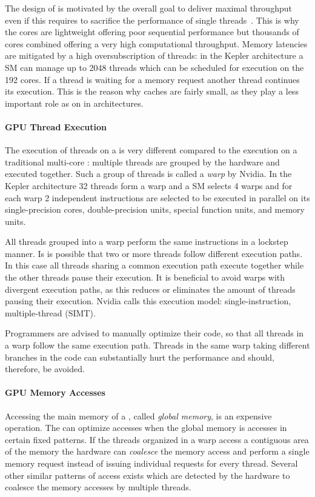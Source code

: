 The design of \GPUs is motivated by the overall goal to deliver maximal throughput even if this requires to sacrifice the performance of single threads~\cite{GarlandK10}.
This is why the \GPU cores are lightweight offering poor sequential performance but thousands of cores combined offering a very high computational throughput.
Memory latencies are mitigated by a high oversubscription of threads:
in the Kepler architecture a SM can manage up to 2048 threads which can be scheduled for execution on the 192 cores.
If a thread is waiting for a memory request another thread continues its execution.
This is the reason why caches are fairly small, as they play a less important role as on in \CPU architectures.

\paragraph{GPU Thread Execution}
The execution of threads on a \GPU is very different compared to the execution on a traditional multi-core \CPU:
multiple threads are grouped by the hardware and executed together.
Such a group of threads is called a \emph{warp} by Nvidia.
In the Kepler architecture 32 threads form a warp and a SM selects 4 warps and for each warp 2 independent instructions are selected to be executed in parallel on its single-precision cores, double-precision units, special function units, and memory units.

All threads grouped into a warp perform the same instructions in a lockstep manner.
Is is possible that two or more threads follow different execution paths.
In this case all threads sharing a common execution path execute together while the other threads pause their execution.
It is beneficial to avoid warps with divergent execution paths, as this reduces or eliminates the amount of threads pausing their execution.
Nvidia calls this execution model: single-instruction, multiple-thread (SIMT).

Programmers are advised to manually optimize their code, so that all threads in a warp follow the same execution path.
Threads in the same warp taking different branches in the code can substantially hurt the performance and should, therefore, be avoided.

\paragraph{GPU Memory Accesses}
Accessing the main memory of a \GPU, called \emph{global memory}, is an expensive operation.
The \GPU can optimize accesses when the global memory is accesses in certain fixed patterns.
If the threads organized in a warp access a contiguous area of the memory the hardware can \emph{coalesce} the memory access and perform a single memory request instead of issuing individual requests for every thread.
Several other similar patterns of access exists which are detected by the hardware to coalesce the memory accesses by multiple threads.

